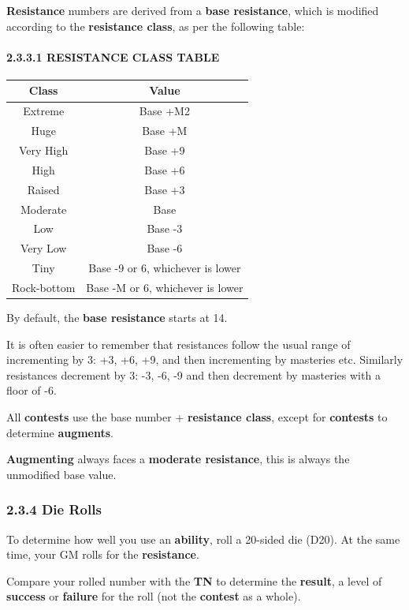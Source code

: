\documentclass[
]{article}
\begin{document}
\textbf{Resistance} numbers are derived from a \textbf{base resistance},
which is modified according to the \textbf{resistance class}, as per the
following table:

\hypertarget{resistance-class-table}{%
\paragraph{2.3.3.1 RESISTANCE CLASS
TABLE}\label{resistance-class-table}}

\begin{longtable}[]{@{}cc@{}}
\toprule
Class & Value\tabularnewline
\midrule
\endhead
Extreme & Base +M2\tabularnewline
Huge & Base +M\tabularnewline
Very High & Base +9\tabularnewline
High & Base +6\tabularnewline
Raised & Base +3\tabularnewline
Moderate & Base\tabularnewline
Low & Base -3\tabularnewline
Very Low & Base -6\tabularnewline
Tiny & Base -9 or 6, whichever is lower\tabularnewline
Rock-bottom & Base -M or 6, whichever is lower\tabularnewline
\bottomrule
\end{longtable}

By default, the \textbf{base resistance} starts at 14.

It is often easier to remember that resistances follow the usual range
of incrementing by 3: +3, +6, +9, and then incrementing by masteries
etc. Similarly resistances decrement by 3: -3, -6, -9 and then decrement
by masteries with a floor of -6.

All \textbf{contests} use the base number + \textbf{resistance class},
except for \textbf{contests} to determine \textbf{augments}.

\textbf{Augmenting} always faces a \textbf{moderate resistance}, this is
always the unmodified base value.

\hypertarget{die-rolls}{%
\subsubsection{2.3.4 Die Rolls}\label{die-rolls}}

To determine how well you use an \textbf{ability}, roll a 20-sided die
(D20). At the same time, your GM rolls for the \textbf{resistance}.

Compare your rolled number with the \textbf{TN} to determine the
\textbf{result}, a level of \textbf{success} or \textbf{failure} for the
roll (not the \textbf{contest} as a whole).
\end{document}
